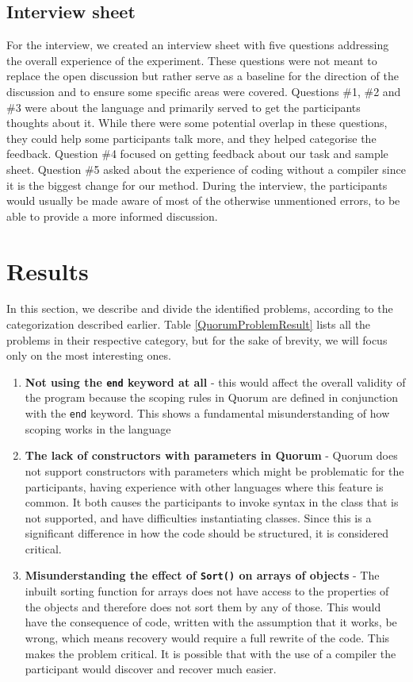 \documentclass[preprint,10pt]{sigplanconf}
\begin{document}
\subsection{Interview sheet}
For the interview, we created an interview sheet with five questions addressing the overall experience of the experiment.
These questions were not meant to replace the open discussion but rather serve as a baseline for the direction of the discussion and to ensure some specific areas were covered.
Questions \#1, \#2 and \#3 were about the language and primarily served to get the participants thoughts about it.
While there were some potential overlap in these questions, they could help some participants talk more, and they helped categorise the feedback.
Question \#4 focused on getting feedback about our task and sample sheet.
Question \#5 asked about the experience of coding without a compiler since it is the biggest change for our method.
During the interview, the participants would usually be made aware of most of the otherwise unmentioned errors, to be able to provide a more informed discussion.

\section{Results}
In this section, we describe and divide the identified problems, according to the categorization described earlier. Table \ref{QuorumProblemResult} lists all the problems in their respective category, but for the sake of brevity, we will focus only on the most interesting ones. 

\begin{enumerate}
\item \textbf{Not using the \lstinline!end! keyword at all} - this would affect the overall validity of the program because the scoping rules in Quorum are defined in conjunction with the \lstinline!end! keyword. This shows a fundamental misunderstanding of how scoping works in the language
\item \textbf{The lack of constructors with parameters in Quorum} - Quorum does not support constructors with parameters which might be problematic for the participants, having experience with other languages where this feature is common. It both causes the participants to invoke syntax in the class that is not supported, and have difficulties instantiating classes. Since this is a significant difference in how the code should be structured, it is considered critical.
\item \textbf{Misunderstanding the effect of \lstinline!Sort()! on arrays of objects} - The inbuilt sorting function for arrays does not have access to the properties of the objects and therefore does not sort them by any of those. This would have the consequence of code, written with the assumption that it works, be wrong, which means recovery would require a full rewrite of the code. This makes the problem critical. It is possible that with the use of a compiler the participant would discover and recover much easier.
\end{enumerate}
\end{document}
